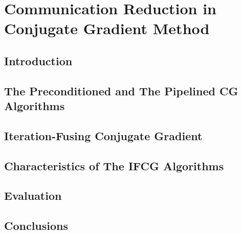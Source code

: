 \chapter{Communication Reduction in Conjugate Gradient Method}
\label{chap:ifcg}

\newcommand{\MAXPERF}{42\%}
\newcommand{\AVERAGEPERF}{13\%}
\newcommand{\MAXLOC}{81\%}
\newcommand{\AVERAGELOC}{28\%}

\section{Introduction}

\section{The Preconditioned and The Pipelined CG Algorithms}
\label{sec:ifcg_existingCG}

\section{Iteration-Fusing Conjugate Gradient}
\label{sec:ifcg_ifcg}

\section{Characteristics of The IFCG Algorithms}
\label{sec:ifcg_characteristics}

\section{Evaluation}
\label{sec:ifcg_results}

\section{Conclusions}
\label{sec:ifcg_conclusions}

